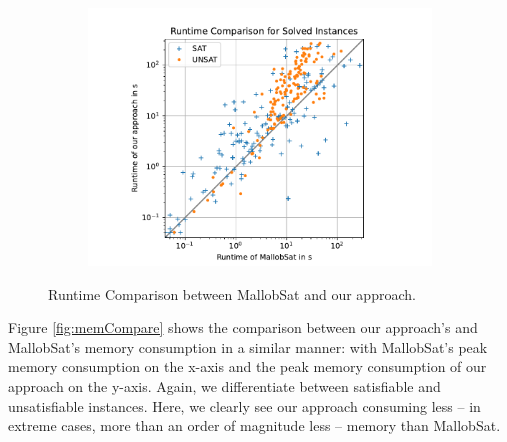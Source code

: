 \documentclass[12pt,a4paper,twoside]{scrartcl}
\numberwithin{equation}{section}
\begin{document}
\begin{figure}
\begin{subfigure}[c]{.45\textwidth}
    \includegraphics[scale=.45]{plots/square_runtime_compare/square_runtime_16node.pdf}
    \label{fig:runtimeCompare16node}
  \end{subfigure}
  \caption{Runtime Comparison between MallobSat and our approach.}
  \label{fig:runtimeCompare}
\end{figure}

Figure \ref{fig:memCompare} shows the comparison between our approach's and MallobSat's memory consumption in a similar manner: with MallobSat's peak memory consumption on the x-axis and the peak memory consumption of our approach on the y-axis. Again, we differentiate between satisfiable and unsatisfiable instances. Here, we clearly see our approach consuming less -- in extreme cases, more than an order of magnitude less -- memory than MallobSat.
\end{document}
